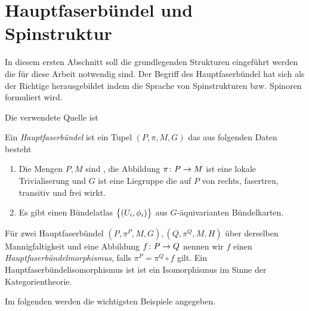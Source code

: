 

\section{Hauptfaserbündel und Spinstruktur}

In diesem ersten Abschnitt soll die grundlegenden Strukturen eingeführt werden die für diese Arbeit notwendig sind. Der Begriff des Hauptfaserbündel hat sich als der Richtige herausgebildet indem die Sprache von Spinstrukturen bzw. Spinoren formuliert wird.

Die verwendete Quelle ist \cite{baum09}

\begin{Def}[Hauptfaserbündel]
	Ein \textit{Hauptfaserbündel} ist ein Tupel $(P,\pi,M,G)$ das aus folgenden Daten besteht
	\begin{enumerate}[\textbullet]
		\item Die Mengen $P,M$ sind \mfgen, die Abbildung $ \pi \colon P \rightarrow M $ ist eine lokale Trivialiserung und $G$ ist eine Liegruppe
		die auf $P$ von rechts, fasertreu, transitiv und frei wirkt. 
		\item Es gibt einen Bündelatlas $\bigl\{ (U_i,\phi_i) \bigr\}$ aus $G$-äquivarianten Bündelkarten. 
	\end{enumerate}		
	Für zwei Hauptfaserbündel $(P,\pi^P,M,G),(Q,\pi^Q,M,H)$ 
	über derselben Mannigfaltigkeit und eine Abbildung $f \colon P \rightarrow Q$ nennen wir $f$ einen \textit{Hauptfaserbündelmorphismus}, falls $ \pi^P=\pi^Q \circ f $ gilt. Ein Hauptfaserbündelisomorphismus ist
	ist ein Isomorphismus im Sinne der Kategorientheorie.
\end{Def}

Im folgenden werden die wichtigsten Beispiele angegeben.

